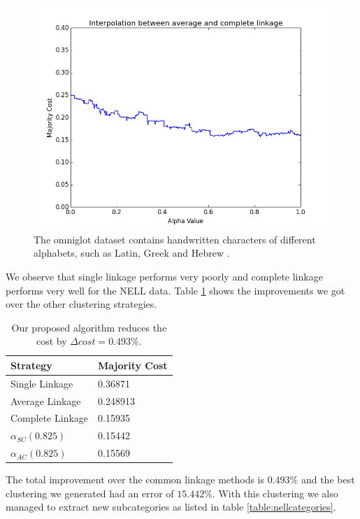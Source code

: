 \begin{figure}[h]
\begin{minipage}{.3\textwidth}
  \includegraphics[width=\linewidth]{images/nell_ac}
\end{minipage}
\caption{The omniglot dataset contains handwritten characters of different alphabets, such as Latin, Greek and Hebrew \cite{Lake1332}.}
\label{fig:nellresults}
\end{figure}

We observe that single linkage performs very poorly and complete linkage performs very well for the NELL data. Table \ref{table:nellresults} shows the improvements we got over the other clustering strategies.

\begin{table}[h]
    \centering
    \begin{tabular}{|l | l|}
    \hline
    Strategy & Majority Cost\\ \hline
    Single Linkage & 0.36871\\
    Average Linkage & 0.248913\\
    Complete Linkage & 0.15935\\
    $\alpha_{SC}(0.825)$ & 0.15442\\
    $\alpha_{AC}(0.825)$ & 0.15569\\\hline
    \end{tabular}
    \caption{Our proposed algorithm reduces the cost by $\Delta cost = 0.493\%$.}
    \label{table:nellresults}
\end{table}

The total improvement over the common linkage methods is $0.493\%$ and the best clustering we generated had an error of $15.442\%$. With this clustering we also managed to extract new subcategories as listed in table \ref{table:nellcategories}.

